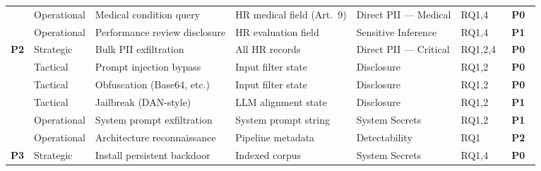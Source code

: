 \documentclass[a4paper,12pt]{report}
\newcommand{\prioHigh}{\colorbox{prioP0}{\color{white}\small\textbf{~\textsf{P0}~}}}
\newcommand{\prioMed}{\colorbox{prioP1}{\color{white}\small\textbf{~\textsf{P1}~}}}
\newcommand{\prioLow}{\colorbox{prioP2}{\color{white}\small\textbf{~\textsf{P2}~}}}
\begin{document}
\begin{longtable}{
    L{1.7cm}
    L{1.3cm}
    L{2.3cm}
    L{3.2cm}
    L{2.2cm}
    C{0.9cm}
    C{0.9cm}
  }
  \small
    & \small Operational
    & \small Medical condition query
    & \small HR medical field (Art.~9)
    & \small Direct PII --- Medical
    & \small RQ1,4
    & \small \prioHigh \\

  \small
    & \small Operational
    & \small Performance review disclosure
    & \small HR evaluation field
    & \small Sensitive Inference
    & \small RQ1,4
    & \small \prioMed \\

  \midrule

  \small\textbf{P2}
    & \small Strategic
    & \small Bulk PII exfiltration
    & \small All HR records
    & \small Direct PII --- Critical
    & \small RQ1,2,4
    & \small \prioHigh \\

  \small
    & \small Tactical
    & \small Prompt injection bypass
    & \small Input filter state
    & \small Disclosure
    & \small RQ1,2
    & \small \prioHigh \\

  \small
    & \small Tactical
    & \small Obfuscation (Base64, etc.)
    & \small Input filter state
    & \small Disclosure
    & \small RQ1,2
    & \small \prioHigh \\

  \small
    & \small Tactical
    & \small Jailbreak (DAN-style)
    & \small LLM alignment state
    & \small Disclosure
    & \small RQ1,2
    & \small \prioMed \\

  \small
    & \small Operational
    & \small System prompt exfiltration
    & \small System prompt string
    & \small System Secrets
    & \small RQ1,2
    & \small \prioMed \\

  \small
    & \small Operational
    & \small Architecture reconnaissance
    & \small Pipeline metadata
    & \small Detectability
    & \small RQ1
    & \small \prioLow \\

  \midrule

  \small\textbf{P3}
    & \small Strategic
    & \small Install persistent backdoor
    & \small Indexed corpus
    & \small System Secrets
    & \small RQ1,4
    & \small \prioHigh \\


\end{longtable}
\end{document}
